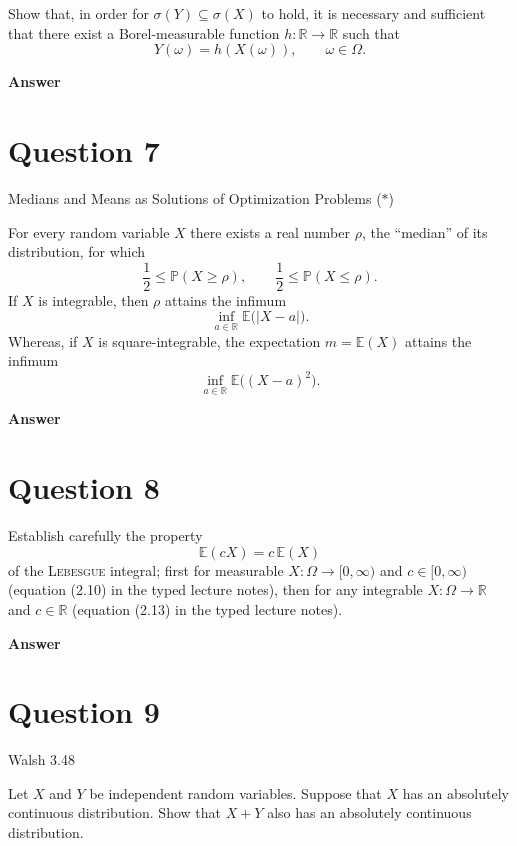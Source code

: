 \documentclass[letterpaper]{article}
\begin{document}
		Show that, in order for $\sigma(Y)\subseteq \sigma(X)$ to hold, it is necessary
		and sufficient that there exist a Borel-measurable function $h:\mathbb{R}\to\mathbb{R}$
		such that
		\[
		Y(\omega)=h(X(\omega)), \qquad \omega\in\Omega.
		\]
		
		\textbf{Answer}
		
		\clearpage
		
		
		\section{Question 7}
		{\color{deepred}Medians and Means as Solutions of Optimization Problems ($\ast$)}
		
		For every random variable $X$ there exists a real number $\rho$, the ``median''
		of its distribution, for which
		\[
		\frac12 \le \mathbb{P}(X\ge \rho),
		\qquad
		\frac12 \le \mathbb{P}(X\le \rho).
		\]
		If $X$ is integrable, then $\rho$ attains the infimum
		\[
		\inf_{a\in\mathbb{R}} \mathbb{E}\bigl(|X-a|\bigr).
		\]
		Whereas, if $X$ is square-integrable, the expectation $m=\mathbb{E}(X)$ attains
		the infimum
		\[
		\inf_{a\in\mathbb{R}} \mathbb{E}\bigl((X-a)^2\bigr).
		\]
		
		\textbf{Answer}
		
		\clearpage
		
		\section{Question 8}
	
	Establish carefully the property
	\[
	\mathbb{E}(cX)=c\,\mathbb{E}(X)
	\]
	of the \textsc{Lebesgue} integral; first for measurable $X:\Omega\to[0,\infty)$
	and $c\in[0,\infty)$ (equation (2.10) in the typed lecture notes), then for any
	integrable $X:\Omega\to\mathbb{R}$ and $c\in\mathbb{R}$ (equation (2.13) in the
	typed lecture notes).

	
		
		\textbf{Answer}
		
		\clearpage
		
		\section{Question 9}
		
		{\color{deepred} Walsh 3.48}
		
		Let $X$ and $Y$ be independent random variables. Suppose that $X$ has an absolutely continuous distribution. Show that $X + Y$ also has an absolutely continuous distribution.
		
\end{document}
